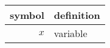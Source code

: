 \begin{tabular}{rl}
  \toprule
  symbol & definition \\
  \midrule
     $x$ & variable   \\
  \bottomrule
\end{tabular}
